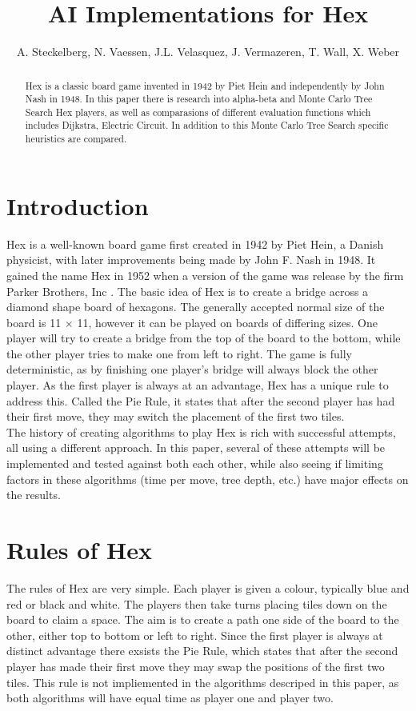 \documentclass{ba-kecs}
\title{AI Implementations for Hex}
\author{A. Steckelberg, N. Vaessen, J.L. Velasquez, J. Vermazeren, T. Wall, X. Weber}
\begin{document}
\maketitle

\begin{abstract}
 Hex is a classic board game invented in 1942 by Piet Hein and independently by John Nash in 1948. In this paper there is research into alpha-beta and Monte Carlo Tree Search Hex players, as well as comparasions of different evaluation functions which includes Dijkstra, Electric Circuit. In addition to this Monte Carlo Tree Search specific heuristics are compared.   
\end{abstract}

\section{Introduction}
Hex is a well-known board game first created in 1942 by Piet Hein, a Danish physicist, with later improvements being made by John F. Nash in 1948. It gained the name Hex in 1952 when a version of the game was release by the firm Parker Brothers, Inc \cite{gardener1959hex}. The basic idea of Hex is to create a bridge across a diamond shape board of hexagons. The generally accepted normal size of the board is 11 $\times$ 11, however it can be played on boards of differing sizes. One player will try to create a bridge from the top of the board to the bottom, while the other player tries to make one from left to right. The game is fully deterministic, as by finishing one player’s bridge will always block the other player. As the first player is always at an advantage, Hex has a unique rule to address this. Called the Pie Rule, it states that after the second player has had their first move, they may switch the placement of the first two tiles.\\
The history of creating algorithms to play Hex is rich with successful attempts, all using a different approach. In this paper, several of these attempts will be implemented and tested against both each other, while also seeing if limiting factors in these algorithms (time per move, tree depth, etc.) have major effects on the results.



\section{Rules of Hex}
The rules of Hex are very simple. Each player is given a colour, typically blue and red or black and white. The players then take turns placing tiles down on the board to claim a space. The aim is to create a path one side of the board to the other, either top to bottom or left to right. Since the first player is always at distinct advantage there exsists the Pie Rule, which states that after the second player has made their first move they may swap the positions of the first two tiles. This rule is not impliemented in the algorithms descriped in this paper, as both algorithms will have equal time as player one and player two.
\end{document}
